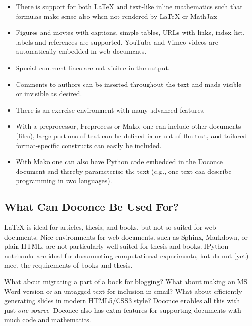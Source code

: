 \documentclass[%
oneside,                 %
final,                   %
10pt]{article}
\begin{document}
\begin{itemize}
  \item There is support for both {\LaTeX} and text-like inline mathematics
    such that formulas make sense also when not rendered by {\LaTeX}
    or MathJax.

  \item Figures and movies with captions, simple tables,
    URLs with links, index list, labels and references are supported.
    YouTube and Vimeo videos are automatically embedded in web documents.

  \item Special comment lines are not visible in the output.

  \item Comments to authors can be inserted throughout the text and
    made visible or invisible as desired.

  \item There is an exercise environment with many advanced features.

  \item With a preprocessor, Preprocess or Mako, one can include
    other documents (files), large portions of text can be defined
    in or out of the text, and tailored format-specific constructs can easily
    be included.

  \item With Mako one can also have Python code
    embedded in the Doconce document and thereby parameterize the
    text (e.g., one text can describe programming in two languages).
\end{itemize}

\noindent
\subsection{What Can Doconce Be Used For?}

{\LaTeX} is ideal for articles, thesis, and books, but not so suited
for web documents. Nice environments for web documents, such as
Sphinx, Markdown, or plain HTML, are not particularly well
suited for thesis and books. IPython notebooks are ideal for
documenting computational experiments, but do not (yet) meet the
requirements of books and thesis.

What about migrating a part of a book for blogging? What about
making an MS Word version or an untagged text for inclusion in email?
What about efficiently generating slides in modern HTML5/CSS3 style?
Doconce enables all this with just \emph{one source}. Doconce also has
extra features for supporting documents with much code and mathematics.
\end{document}
